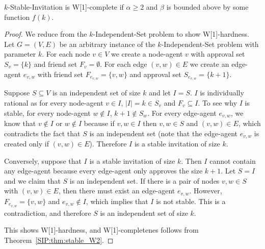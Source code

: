 \begin{theorem} \label{SIP:thm:stable_W1hard_alpha2_beta0}
	$k$-Stable-Invitation is W[1]-complete if $\alpha \geq 2$ and $\beta$ is bounded above by some function $f(k)$.
\end{theorem}
\begin{proof}
	We reduce from the $k$-Independent-Set problem to show W[1]-hardness. 
	Let $G = (V, E)$ be an arbitrary instance of the $k$-Independent-Set problem with parameter $k$. 
	For each node $v\in V$ we create a node-agent $v$ with approval set $S_v = \{k\}$ and friend set $F_v = \emptyset$.
	For each edge $(v, w) \in E$ we create an edge-agent $e_{v,w}$ with friend set $F_{e_{v,w}} = \{v, w\}$ and approval set $S_{e_{v,w}} = \{k+1\}$.
	
	Suppose $S \subseteq V$ is an independent set of size $k$ and let $I = S$. $I$ is individually rational as for every node-agent $v\in I$, $|I| = k \in S_v$ and $F_v \subseteq I$. To see why $I$ is stable, for every node-agent $w \not\in I$, $k+1 \not\in S_w$. For every edge-agent $e_{v,w}$, we know that $v\not\in I$ or $w\not\in I$ because if $v,w\in I$ then $v,w\in S$ and $(v,w)\in E$, which contradicts the fact that $S$ is an independent set (note that the edge-agent $e_{v,w}$ is created only if $(v,w)\in E$). Therefore $I$ is a stable invitation of size $k$.
	
	Conversely, suppose that $I$ is a stable invitation of size $k$. Then $I$ cannot contain any edge-agent because every edge-agent only approves the size $k+1$. Let $S = I$ and we claim that $S$ is an independent set. If there is a pair of nodes $v,w \in S$ with $(v, w)\in E$, then there must exist an edge-agent $e_{v,w}$. However, $F_{e_{v,w}} = \{v, w\}$ and $e_{v,w}\not\in I$, which implies that $I$ is not stable. This is a contradiction, and therefore $S$ is an independent set of size $k$. 

	This shows W[1]-hardness, and W[1]-completenes follows from Theorem~\ref{SIP:thm:stable_W2}.
\end{proof}


